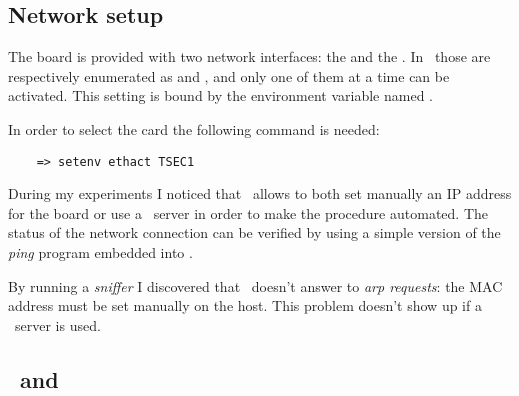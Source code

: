 \subsection{ Network setup }

    The board is provided with two network interfaces: the
     and the . In
    \uBoot\ those are respectively enumerated as  and
    , and only one of them at a time can be
    activated. This setting is bound by the environment variable
    named .

    In order to select the  card the following
    command is needed:
\begin{lstlisting}
    => setenv ethact TSEC1
\end{lstlisting}


    During my experiments I noticed that \uBoot\ allows to both set
    manually an IP address for the board or use a \BootP\ server in order
    to make the procedure automated. The status of the network connection
    can be verified by using a simple version of the \emph{ping} program
    embedded into \uBoot.

    By running a \emph{sniffer} I discovered that \uBoot\ doesn't answer
    to \emph{arp requests}: the MAC address must be set manually on the
    host. This problem doesn't show up if a \BootP\ server is used.


\subsection{ \BootPd\ and \TFTPd } \label{sub:Xinetd}

